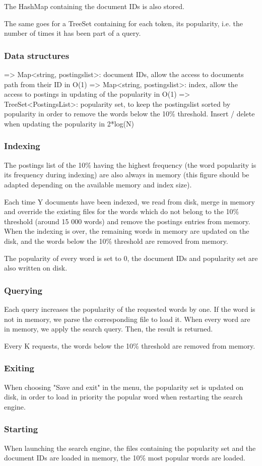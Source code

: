 The HashMap containing the document IDs is also stored.

The same goes for a TreeSet containing for each token, its popularity, i.e. the number of times it has been part of a query.

\subsubsection{Data structures}
=> Map<string, postingslist>: document IDs, allow the access to documents path from their ID in O(1)
=> Map<string, postingslist>: index, allow the access to postings in updating of the popularity in O(1)
=> TreeSet<PostingsList>: popularity set, to keep the postingslist sorted by popularity in order to remove the words below the 10\% threshold. Insert / delete when updating the popularity in 2*log(N)

\subsubsection{Indexing}
The postings list of the 10\% having the highest frequency (the word popularity is its frequency during indexing) are also always in memory (this figure should be adapted depending on the available memory and index size).

Each time Y documents have been indexed, we read from disk, merge in memory and override the existing files for the words which do not belong to the 10\% threshold (around 15 000 words) and remove the postings entries from memory.
When the indexing is over, the remaining words in memory are updated on the disk, and the words below the 10\% threshold are removed from memory.

The popularity of every word is set to 0, the document IDs and popularity set are also written on disk.

\subsubsection{Querying}
Each query increases the popularity of the requested words by one.
If the word is not in memory, we parse the corresponding file to load it.
When every word are in memory, we apply the search query.
Then, the result is returned.

Every K requests, the words below the 10\% threshold are removed from memory.

\subsubsection{Exiting}
When choosing "Save and exit" in the menu, the popularity set is updated on disk, in order to load in priority the popular word when restarting the search engine.

\subsubsection{Starting}
When launching the search engine, the files containing the popularity set and the document IDs are loaded in memory, the 10\% most popular words are loaded.
